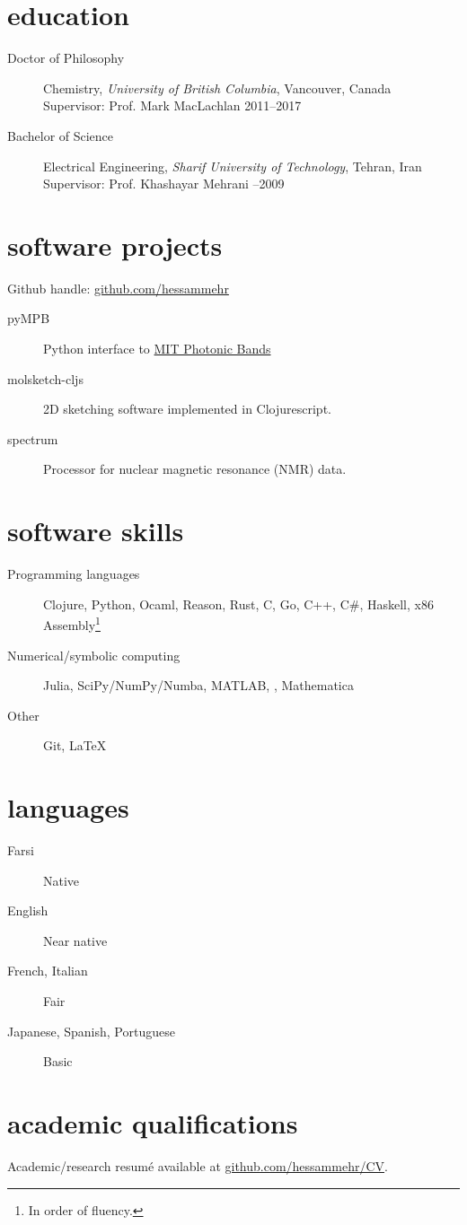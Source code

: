 \documentclass[overlapped,line,10pt,letterpaper]{res}
\begin{document}
\begin{resume}
\section{education}
\begin{description}
\item [Doctor of Philosophy] Chemistry, \emph{University of British Columbia}, Vancouver, Canada   \\ Supervisor: Prof. Mark MacLachlan \hspace{\fill} 2011–2017
\item [Bachelor of Science] Electrical Engineering, \emph{Sharif University of Technology}, Tehran, Iran \\ Supervisor: Prof. Khashayar Mehrani \hspace{}–2009
\end{description}

\section{software projects}
Github handle: \href{https://github.com/hessammehr}{github.com/hessammehr}
\begin{description}
\item[pyMPB] Python interface to \href{http://ab-initio.mit.edu/wiki/index.php/MIT_Photonic_Bands}{MIT Photonic Bands}
\item[molsketch-cljs] 2D sketching software implemented in Clojurescript.
\item[spectrum] Processor for nuclear magnetic resonance (NMR) data.
\end{description}

\section{software skills}
\begin{description}
\item[Programming languages] Clojure, Python, Ocaml, Reason, Rust, C, Go, C++, C\#, Haskell, x86 Assembly\footnote{In order of fluency.}
\item[Numerical/symbolic computing] Julia, SciPy/NumPy/Numba, MATLAB, , Mathematica
\item[Other] Git, \LaTeX
\end{description}

\section{languages}
\begin{description}
\item[Farsi] Native
\item[English] Near native
\item[French, Italian] Fair
\item[Japanese, Spanish, Portuguese] Basic
\end{description}

\section{academic qualifications}
Academic/research resumé available at \href{https://github.com/hessammehr/CV/raw/master/myCV.pdf}{github.com/hessammehr/CV}.
\end{resume}
\end{document}
